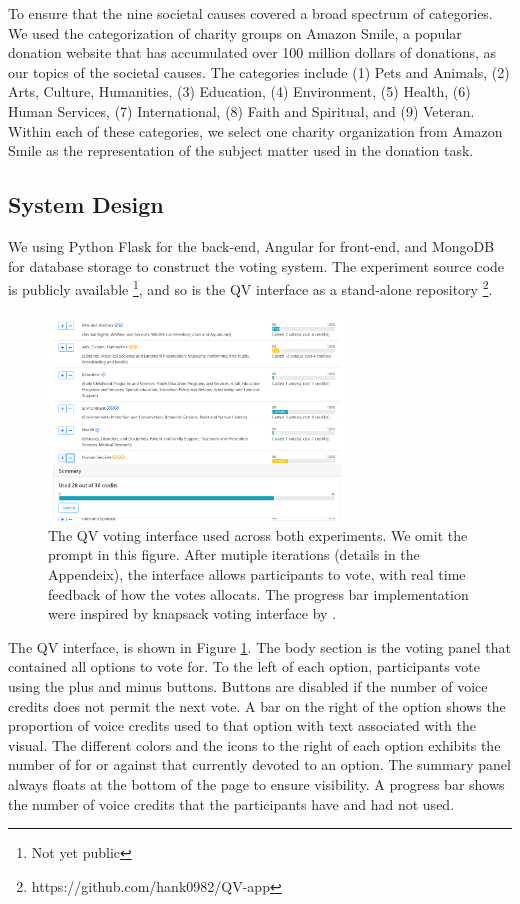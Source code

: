 To ensure that the nine societal causes 
covered a broad spectrum of categories.
We used the categorization of charity groups on Amazon Smile, 
a popular donation website that has accumulated over 100 million dollars of donations, 
as our topics of the societal causes.
The categories include (1) Pets and Animals, (2) Arts, Culture, Humanities, (3) Education, (4) Environment, 
(5) Health, (6) Human Services, (7) International, (8) Faith and Spiritual, and (9) Veteran. 
Within each of these categories, 
we select one charity organization from Amazon Smile 
as the representation of the subject matter used in the donation task.

\subsection{System Design}
We using Python Flask for the back-end, Angular for front-end, 
and MongoDB for database storage to construct the voting system. 
The experiment source code is publicly available \footnote{Not yet public}, 
and so is the QV interface as a stand-alone repository \footnote{https://github.com/hank0982/QV-app}.

\begin{figure}[htpb]
    \centering
    \includegraphics[width=0.7\textwidth, keepaspectratio=true]{content/image/qv-donation.png}
    \caption{
        The QV voting interface used across both experiments. 
        We omit the prompt in this figure.
        After mutiple iterations (details in the Appendeix), 
        the interface allows participants to vote, 
        with real time feedback of how the votes allocats. 
        The progress bar implementation 
        were inspired by knapsack voting interface by \textcite{goel2015knapsack}.
    }
    \label{fig:qv_donation}
\end{figure}

The QV interface, is shown in Figure \ref{fig:qv_donation}.
The body section is the voting panel
that contained all options to vote for.
To the left of each option, 
participants vote using the plus and minus buttons.
Buttons are disabled 
if the number of voice credits 
does not permit the next vote.
A bar on the right of the option 
shows the proportion of voice credits 
used to that option with text associated with the visual.
The different colors and the icons 
to the right of each option 
exhibits the number of for or against 
that currently devoted to an option.
The summary panel always 
floats at the bottom of the page 
to ensure visibility.
A progress bar shows the number of voice credits 
that the participants have and had not used.\par